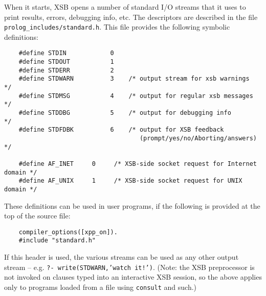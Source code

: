 When it starts, XSB opens a number of standard I/O streams that it
uses to print results, errors, debugging info, etc. The descriptors
are described in the file {\tt prolog\_includes/standard.h}. This file
provides the following symbolic definitions:
\begin{verbatim}
    #define STDIN            0
    #define STDOUT           1
    #define STDERR           2
    #define STDWARN          3    /* output stream for xsb warnings  */
    #define STDMSG           4    /* output for regular xsb messages */
    #define STDDBG           5    /* output for debugging info       */
    #define STDFDBK          6    /* output for XSB feedback
                                     (prompt/yes/no/Aborting/answers) */

    #define AF_INET     0     /* XSB-side socket request for Internet domain */
    #define AF_UNIX     1     /* XSB-side socket request for UNIX domain */
\end{verbatim}
These definitions can be used in user programs, if the following is
provided at the top of the source file:
\begin{verbatim}
    compiler_options([xpp_on]).
    #include "standard.h"
\end{verbatim}
If this header is used, the various streams can be used as any other output stream -- e.g. 
{\tt ?- write(STDWARN,'watch it!')}.
%
(Note: the XSB preprocessor is not invoked on clauses typed into an
interactive XSB session, so the above applies only to programs loaded from
a file using {\tt consult} and such.)

